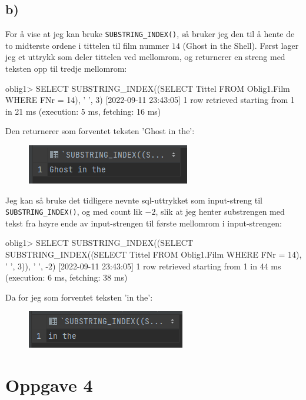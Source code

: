 \documentclass[%
notitlepage,
 amsmath,amssymb,
 aps,
rmp,
]{revtex4-2}  %
\begin{document}
\subsection*{b)}
For å vise at jeg kan bruke \verb+SUBSTRING_INDEX()+, så bruker jeg den til å hente de to midterste ordene i tittelen til film nummer \(14\) (Ghost in the Shell). Først lager jeg et uttrykk som deler tittelen ved mellomrom, og returnerer en streng med teksten opp til tredje mellomrom:
\begin{sql}
oblig1> SELECT SUBSTRING_INDEX((SELECT Tittel FROM Oblig1.Film WHERE FNr = 14), ' ', 3)
[2022-09-11 23:43:05] 1 row retrieved starting from 1 in 21 ms (execution: 5 ms, fetching: 16 ms)
\end{sql}
Den returnerer som forventet teksten 'Ghost in the':
\begin{figure}[H]
\centering\includegraphics[scale=1]{op3b1.png}
\end{figure}

Jeg kan så bruke det tidligere nevnte sql-uttrykket som input-streng til \verb+SUBSTRING_INDEX()+, og med count lik \(-2\), slik at jeg henter substrengen med tekst fra høyre ende av input-strengen til første mellomrom i input-strengen:
\begin{sql}
oblig1> SELECT SUBSTRING_INDEX((SELECT SUBSTRING_INDEX((SELECT Tittel FROM Oblig1.Film WHERE FNr = 14), ' ', 3)), ' ', -2)
[2022-09-11 23:43:05] 1 row retrieved starting from 1 in 44 ms (execution: 6 ms, fetching: 38 ms)
\end{sql}
Da for jeg som forventet teksten 'in the':
\begin{figure}[H]
\centering\includegraphics[scale=1]{op3b2.png}
\end{figure}

\section*{Oppgave 4}
\end{document}
